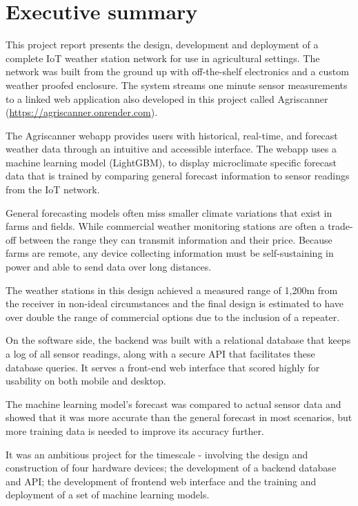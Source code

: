 \documentclass[11pt]{article}
\begin{document}




\section*{Executive summary}
This project report presents the design, development and deployment of a
complete IoT weather station network for use in agricultural settings. The
network was built from the ground up with off-the-shelf electronics and a custom
weather proofed enclosure. The system streams one minute sensor measurements to
a linked web application also developed in this project called Agriscanner
(\url{https://agriscanner.onrender.com}).

The Agriscanner webapp provides users with historical, real-time, and forecast
weather data through an intuitive and accessible interface. The webapp uses a
machine learning model (LightGBM), to display microclimate specific forecast
data that is trained by comparing general forecast information to sensor
readings from the IoT network.

General forecasting models often miss smaller climate variations that exist in
farms and fields. While commercial weather monitoring stations are often a
trade-off between the range they can transmit information and their price.
Because farms are remote, any device collecting information must be
self-sustaining in power and able to send data over long distances.

The weather stations in this design achieved a measured range of 1,200m from the
receiver in non-ideal circumstances and the final design is estimated to have
over double the range of commercial options due to the inclusion of a repeater.

On the software side, the backend was built with a relational database that
keeps a log of all sensor readings, along with a secure API that facilitates
these database queries. It serves a front-end web interface that scored highly
for usability on both mobile and desktop.

The machine learning model's forecast was compared to actual sensor data and
showed that it was more accurate than the general forecast in most scenarios,
but more training data is needed to improve its accuracy further.

It was an ambitious project for the timescale - involving the design and
construction of four hardware devices; the development of a backend database and
API; the development of frontend web interface and the training and deployment
of a set of machine learning models.
\end{document}
